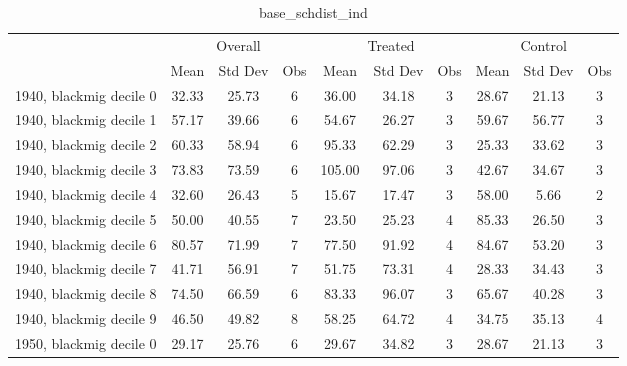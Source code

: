 \begin{table}[htbp]\centering
\def\sym#1{\ifmmode^{#1}\else\(^{#1}\)\fi}
\caption{base\_schdist\_ind \label{tab1}}
\begin{tabular}{l*{3}{ccc}}
\toprule
                    &\multicolumn{3}{c}{Overall}           &\multicolumn{3}{c}{Treated}           &\multicolumn{3}{c}{Control}           \\
                    &        Mean&     Std Dev&         Obs&        Mean&     Std Dev&         Obs&        Mean&     Std Dev&         Obs\\
\midrule
1940, blackmig decile 0&       32.33&       25.73&           6&       36.00&       34.18&           3&       28.67&       21.13&           3\\
1940, blackmig decile 1&       57.17&       39.66&           6&       54.67&       26.27&           3&       59.67&       56.77&           3\\
1940, blackmig decile 2&       60.33&       58.94&           6&       95.33&       62.29&           3&       25.33&       33.62&           3\\
1940, blackmig decile 3&       73.83&       73.59&           6&      105.00&       97.06&           3&       42.67&       34.67&           3\\
1940, blackmig decile 4&       32.60&       26.43&           5&       15.67&       17.47&           3&       58.00&        5.66&           2\\
1940, blackmig decile 5&       50.00&       40.55&           7&       23.50&       25.23&           4&       85.33&       26.50&           3\\
1940, blackmig decile 6&       80.57&       71.99&           7&       77.50&       91.92&           4&       84.67&       53.20&           3\\
1940, blackmig decile 7&       41.71&       56.91&           7&       51.75&       73.31&           4&       28.33&       34.43&           3\\
1940, blackmig decile 8&       74.50&       66.59&           6&       83.33&       96.07&           3&       65.67&       40.28&           3\\
1940, blackmig decile 9&       46.50&       49.82&           8&       58.25&       64.72&           4&       34.75&       35.13&           4\\
1950, blackmig decile 0&       29.17&       25.76&           6&       29.67&       34.82&           3&       28.67&       21.13&           3\\

\end{tabular}
\end{table}
